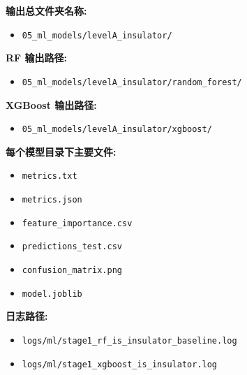 \documentclass[lang=cn,scheme=chinese,color=blue,device=normal,toc=onecol,math=cm]{elegantbook}
\begin{document}
\textbf{输出总文件夹名称:}\par


\begin{itemize}
\item \texttt{05\_\allowbreak{}ml\_\allowbreak{}models/\allowbreak{}levelA\_\allowbreak{}insulator/\allowbreak{}}
\end{itemize}


\textbf{RF 输出路径:}\par


\begin{itemize}
\item \texttt{05\_\allowbreak{}ml\_\allowbreak{}models/\allowbreak{}levelA\_\allowbreak{}insulator/\allowbreak{}random\_\allowbreak{}forest/\allowbreak{}}
\end{itemize}


\textbf{XGBoost 输出路径:}\par


\begin{itemize}
\item \texttt{05\_\allowbreak{}ml\_\allowbreak{}models/\allowbreak{}levelA\_\allowbreak{}insulator/\allowbreak{}xgboost/\allowbreak{}}
\end{itemize}


\textbf{每个模型目录下主要文件:}\par


\begin{itemize}
\item \texttt{metrics.txt}
\item \texttt{metrics.json}
\item \texttt{feature\_\allowbreak{}importance.csv}
\item \texttt{predictions\_\allowbreak{}test.csv}
\item \texttt{confusion\_\allowbreak{}matrix.png}
\item \texttt{model.joblib}
\end{itemize}


\textbf{日志路径:}\par


\begin{itemize}
\item \texttt{logs/\allowbreak{}ml/\allowbreak{}stage1\_\allowbreak{}rf\_\allowbreak{}is\_\allowbreak{}insulator\_\allowbreak{}baseline.log}
\item \texttt{logs/\allowbreak{}ml/\allowbreak{}stage1\_\allowbreak{}xgboost\_\allowbreak{}is\_\allowbreak{}insulator.log}
\end{itemize}
\end{document}
